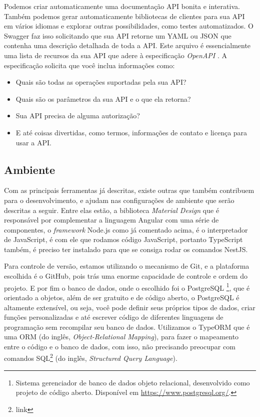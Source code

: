 Podemos criar automaticamente uma documentação API bonita e interativa. Também podemos gerar automaticamente bibliotecas de clientes para sua API em vários idiomas e explorar outras possibilidades, como testes automatizados. O Swagger faz isso solicitando que sua API retorne um YAML ou JSON que contenha uma descrição detalhada de toda a API. Este arquivo é essencialmente uma lista de recursos da sua API que adere à especificação \textit{OpenAPI} \cite{shockey2020Swagger}. A especificação solicita que você inclua informações como:

\begin{itemize}
    \item Quais são todas as operações suportadas pela sua API? 
    \item Quais são os parâmetros da sua API e o que ela retorna?   
    \item Sua API precisa de alguma autorização?
    \item E até coisas divertidas, como termos, informações de contato e licença para usar a API.
\end{itemize}

\subsection{Ambiente}
\label{ssec:Ambiente}
Com as principais ferramentas já descritas, existe outras que também contribuem para o desenvolvimento, e ajudam nas configurações de ambiente que serão descritas a seguir. Entre elas estão, a biblioteca \textit{Material Design} que é responsável por complementar a linguagem Angular com uma série de componentes, o \textit{framework} Node.js como já comentado acima, é o interpretador de JavaScript, é com ele que rodamos código JavaScript, portanto TypeScript também, é preciso ter instalado para que se consiga rodar os comandos NestJS. 

Para controle de versão, estamos utilizando o mecanismo de Git, e a plataforma escolhida é o GitHub, pois trás uma enorme capacidade de controle e ordem do projeto. E por fim o banco de dados, onde o escolhido foi o PostgreSQL \footnote{Sistema gerenciador de banco de dados objeto relacional, desenvolvido como projeto de código aberto. Disponível em \url{https://www.postgresql.org/}.}, que é orientado a objetos, além de ser gratuito e de código aberto, o PostgreSQL é altamente extensível, ou seja, você pode definir seus próprios tipos de dados, criar funções personalizadas e até escrever código de diferentes linguagens de programação sem recompilar seu banco de dados. Utilizamos o TypeORM que é uma ORM (do inglês, \textit{Object-Relational Mapping}), para fazer o mapeamento entre o código e o banco de dados, com isso, não precisando preocupar com comandos SQL\footnote{link} (do inglês, \textit{Structured Query Language}).
